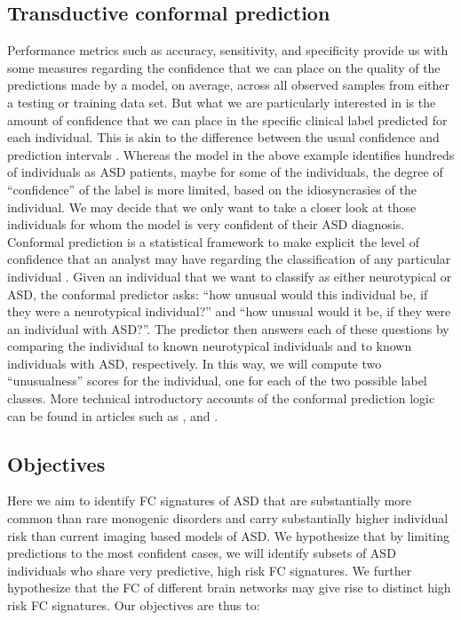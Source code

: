 \documentclass[9pt,lineno]{elife}
\begin{document}
\subsection{Transductive conformal prediction}
Performance metrics such as accuracy, sensitivity, and specificity provide us with some measures regarding the confidence that we can place on the quality of the predictions made by a model, on average, across all observed samples from either a testing or training data set. But what we are particularly interested in is the amount of confidence that we can place in the specific clinical label predicted for each individual. This is akin to the difference between the usual confidence  and prediction intervals \citep{Kummel2018-tm}. Whereas the model in the above example identifies hundreds of individuals as ASD patients, maybe for some of the individuals, the degree of “confidence” of the label is more limited, based on the idiosyncrasies of the individual. We may decide that we only want to take a closer look at those individuals for whom the model is very confident of their ASD diagnosis. Conformal prediction is a statistical framework to make explicit the level of confidence that an analyst may have regarding the classification of any particular individual \citep{Vovk2005-uc}. Given an individual that we want to classify as either neurotypical or ASD, the conformal predictor asks: “how unusual would this individual be, if they were a neurotypical individual?” and “how unusual would it be, if they were an individual with ASD?”. The predictor then answers each of these questions by comparing the individual to known neurotypical individuals and to known individuals with ASD, respectively. In this way, we will compute two “unusualness” scores for the individual, one for each of the two possible label classes. More technical introductory accounts of the conformal prediction logic can be found in articles such as \citet{Gammerman2007-iu}, and \citet{Shafer2008-lf}.

\subsection{Objectives}
Here we aim to identify FC signatures of ASD that are substantially more common than rare monogenic disorders and carry substantially higher individual risk than current imaging based models of ASD. We hypothesize that by limiting predictions to the most confident cases, we will identify subsets of ASD individuals who share very predictive, high risk FC signatures. We further hypothesize that the FC of different brain networks may give rise to distinct high risk FC signatures. Our objectives are thus to:
\end{document}
